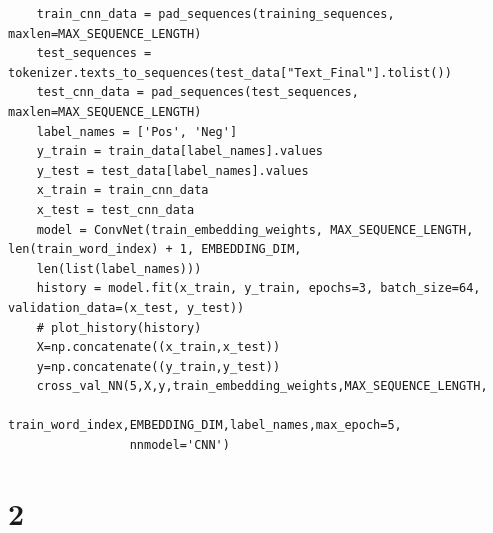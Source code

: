 \documentclass[11pt]{article} %
\begin{document}
\begin{verbatim}
    train_cnn_data = pad_sequences(training_sequences, maxlen=MAX_SEQUENCE_LENGTH)
    test_sequences = tokenizer.texts_to_sequences(test_data["Text_Final"].tolist())
    test_cnn_data = pad_sequences(test_sequences, maxlen=MAX_SEQUENCE_LENGTH)
    label_names = ['Pos', 'Neg']
    y_train = train_data[label_names].values
    y_test = test_data[label_names].values
    x_train = train_cnn_data
    x_test = test_cnn_data
    model = ConvNet(train_embedding_weights, MAX_SEQUENCE_LENGTH, len(train_word_index) + 1, EMBEDDING_DIM,
    len(list(label_names)))
    history = model.fit(x_train, y_train, epochs=3, batch_size=64, validation_data=(x_test, y_test))
    # plot_history(history)
    X=np.concatenate((x_train,x_test))
    y=np.concatenate((y_train,y_test))
    cross_val_NN(5,X,y,train_embedding_weights,MAX_SEQUENCE_LENGTH,
                 train_word_index,EMBEDDING_DIM,label_names,max_epoch=5,
                 nnmodel='CNN')
\end{verbatim}
\section{2}
\end{document}
